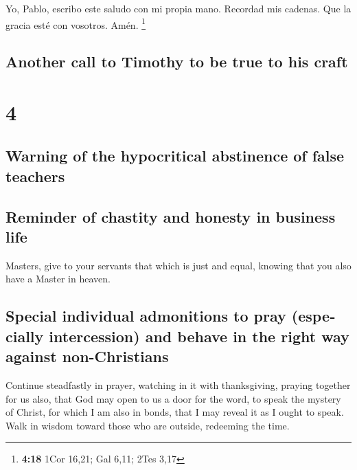 \begin{paracol}{2}
 Yo, Pablo, escribo este saludo con mi propia mano.
Recordad mis cadenas. Que la gracia esté con vosotros. Amén. \footnote{\textbf{4:18}
  1Cor 16,21; Gal 6,11; 2Tes 3,17} \switchcolumn
\begin{otherlanguage}{english}

\hypertarget{another-call-to-timothy-to-be-true-to-his-craft}{%
\subsection{Another call to Timothy to be true to his
craft}\label{another-call-to-timothy-to-be-true-to-his-craft}}

\hypertarget{section-7}{%
\section{4}\label{section-7}}

\hypertarget{warning-of-the-hypocritical-abstinence-of-false-teachers}{%
\subsection{Warning of the hypocritical abstinence of false
teachers}\label{warning-of-the-hypocritical-abstinence-of-false-teachers}}

\hypertarget{reminder-of-chastity-and-honesty-in-business-life}{%
\subsection{Reminder of chastity and honesty in business
life}\label{reminder-of-chastity-and-honesty-in-business-life}}

 Masters, give to your servants that which is just and
equal, knowing that you also have a Master in heaven.

\hypertarget{special-individual-admonitions-to-pray-especially-intercession-and-behave-in-the-right-way-against-non-christians}{%
\subsection{Special individual admonitions to pray (especially
intercession) and behave in the right way against
non-Christians}\label{special-individual-admonitions-to-pray-especially-intercession-and-behave-in-the-right-way-against-non-christians}}

 Continue steadfastly in prayer, watching in it with
thanksgiving,  praying together for us also, that God may
open to us a door for the word, to speak the mystery of Christ, for
which I am also in bonds,  that I may reveal it as I ought
to speak.  Walk in wisdom toward those who are outside,
redeeming the time.


\end{otherlanguage}
\end{paracol}
